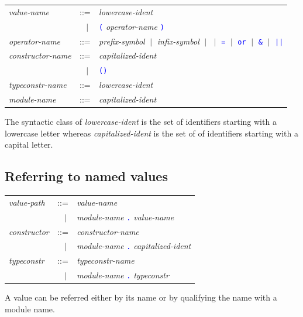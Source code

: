 \documentclass[11pt,titlepage,twoside]{report}
\newcommand{\alt}{\;|\;}
\newcommand{\term}[1]{\textcolor{Blue}{\tt #1}}
\newcommand{\nterm}[1]{\textcolor{BrickRed}{\it #1}}
\newcommand{\term}[1]{{\tt #1}}
\newcommand{\nterm}[1]{{\em #1}}
\begin{document}
\begin{center}
\begin{tabular}{lcl}
\nterm{value-name}       & ::=    & \nterm{lowercase-ident} \\
                         & $\;\;\alt$ & \term{(} \nterm{operator-name}
                                        \term{)} \\
\nterm{operator-name}    & ::=    & \nterm{prefix-symbol} 
                           $\alt$   \nterm{infix-symbol} 
                           $\alt$   \term{*} $\alt$ \term{=} $\alt$ \term{or}
                           $\alt$   \term{\&} $\alt$ \term{||} \\
\nterm{constructor-name} & ::=    & \nterm{capitalized-ident} \\
                         & $\;\;\alt$ & \term{()} \\
\nterm{typeconstr-name}  & ::=    & \nterm{lowercase-ident} \\
\nterm{module-name}      & ::=    & \nterm{capitalized-ident}
\end{tabular}
\end{center}

The syntactic class of \nterm{lowercase-ident} is the
set of identifiers starting with a lowercase letter whereas
\nterm{capitalized-ident} is the set of of identifiers starting with a
capital letter.

\subsection{Referring to named values\label{refnamedvalues}} %

\begin{center}
\begin{tabular}{lcl}
\nterm{value-path}  & ::=        & \nterm{value-name} \\
                    & $\;\;\alt$ & \nterm{module-name} \term{.}
                                   \nterm{value-name} \\
\nterm{constructor} & ::=        & \nterm{constructor-name} \\
                    & $\;\;\alt$ & \nterm{module-name} \term{.}
                                   \nterm{capitalized-ident} \\
\nterm{typeconstr}  & ::=        & \nterm{typeconstr-name} \\
                    & $\;\;\alt$ & \nterm{module-name} \term{.} 
                                   \nterm{typeconstr}
\end{tabular}
\end{center}
A value can be referred either by its name or by qualifying the name
with a module name.
\end{document}
